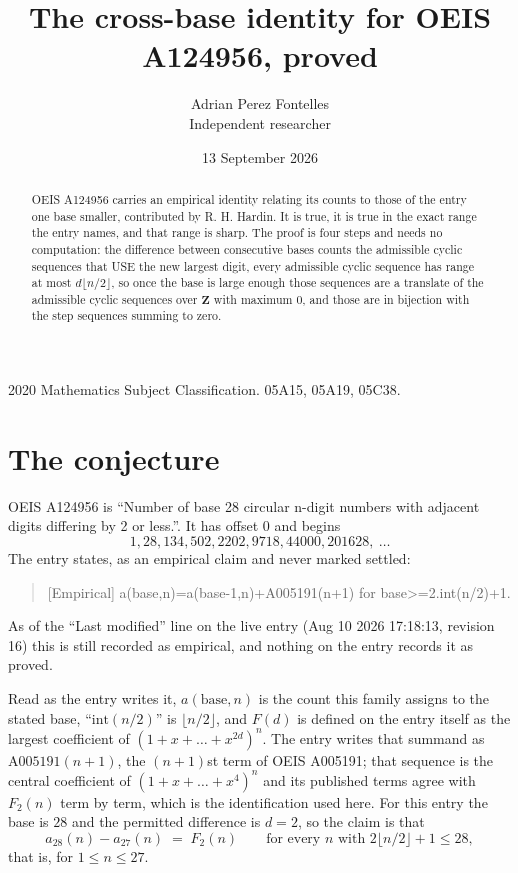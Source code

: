 \documentclass[11pt,a4paper]{article}
\title{The cross-base identity for OEIS A124956, proved}
\author{Adrian Perez Fontelles\\ \small Independent researcher}
\date{13 September 2026}
\theoremstyle{plain}
\theoremstyle{definition}
\begin{document}
\maketitle

\begin{abstract}
OEIS A124956 carries an empirical identity relating its counts to those of the entry one base
smaller, contributed by R. H. Hardin. It is true, it is true in the exact range the entry
names, and that range is sharp. The proof is four steps and needs no computation: the
difference between consecutive bases counts the admissible cyclic sequences that USE the new
largest digit, every admissible cyclic sequence has range at most $d\lfloor n/2\rfloor$, so
once the base is large enough those sequences are a translate of the admissible cyclic
sequences over $\mathbf{Z}$ with maximum $0$, and those are in bijection with the step
sequences summing to zero.
\end{abstract}

\noindent\small 2020 Mathematics Subject Classification. 05A15, 05A19, 05C38.\normalsize

\section{The conjecture}

OEIS A124956 is ``Number of base 28 circular n-digit numbers with adjacent digits differing by 2 or less.''. It has offset $0$ and begins
\[
1, 28, 134, 502, 2202, 9718, 44000, 201628,\ \dots
\]
The entry states, as an empirical claim and never marked settled:
\begin{quote}
[Empirical] a(base,n)=a(base-1,n)+A005191(n+1) for base>=2.int(n/2)+1.
\end{quote}
As of the ``Last modified'' line on the live entry (Aug 10 2026 17:18:13, revision 16)
this is still recorded as empirical, and nothing on the entry records it as proved.

Read as the entry writes it, $a(\mathrm{base},n)$ is the count this family assigns to the
stated base, ``$\mathrm{int}(n/2)$'' is $\lfloor n/2\rfloor$, and $F(d)$ is defined on the
entry itself as the largest coefficient of $(1+x+\dots+x^{2d})^{n}$. The entry writes that summand as $\mathrm{A005191}(n+1)$, the $(n+1)$st term of OEIS A005191; that sequence is the central coefficient of $(1+x+\dots+x^{4})^{n}$ and its published terms agree with $F_{2}(n)$ term by term, which is the identification used here. For this entry
the base is $28$ and the permitted difference is $d=2$, so the claim is that
\[
a_{28}(n)-a_{27}(n)\;=\;F_{2}(n)
\qquad\text{for every } n \text{ with } 2\lfloor n/2\rfloor+1\le28,
\]
that is, for $1\le n\le27$.
\end{document}
